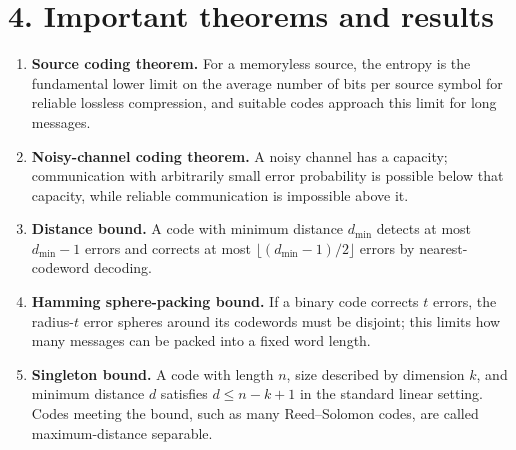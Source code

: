 \section*{4. Important theorems and results}
\begin{enumerate}[leftmargin=*,itemsep=0.35em]

\item \textbf{Source coding theorem.} For a memoryless source, the entropy is the fundamental lower limit on the average number of bits per source symbol for reliable lossless compression, and suitable codes approach this limit for long messages. \cite{coding_theory_ref2}

\item \textbf{Noisy-channel coding theorem.} A noisy channel has a capacity; communication with arbitrarily small error probability is possible below that capacity, while reliable communication is impossible above it. \cite{coding_theory_ref2}

\item \textbf{Distance bound.} A code with minimum distance $d_{\min}$ detects at most $d_{\min}-1$ errors and corrects at most $\lfloor(d_{\min}-1)/2\rfloor$ errors by nearest-codeword decoding. \cite{coding_theory_ref1}

\item \textbf{Hamming sphere-packing bound.} If a binary code corrects $t$ errors, the radius-$t$ error spheres around its codewords must be disjoint; this limits how many messages can be packed into a fixed word length. \cite{coding_theory_ref1}

\item \textbf{Singleton bound.} A code with length $n$, size described by dimension $k$, and minimum distance $d$ satisfies $d\leq n-k+1$ in the standard linear setting. Codes meeting the bound, such as many Reed--Solomon codes, are called maximum-distance separable. \cite{coding_theory_ref8}
\end{enumerate}

\theoryapplications
{}
